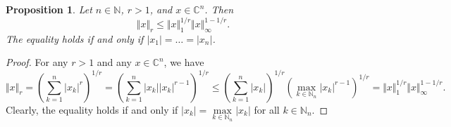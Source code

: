 \documentclass[12pt]{article}
\newtheorem{proposition}[theorem]{Proposition}
\begin{document}
\begin{proposition}\label{SpclLyapIneq}
    Let $n\in\mathbb{N}$, $r>1$, and $x\in\mathbb{C}^n$. Then
    \[
        \Vert x\Vert_r\leq \Vert x\Vert_1^{1/r}\Vert x\Vert_\infty^{1-1/r}.
    \]
    The equality holds if and only if $|x_1|=\ldots=|x_n|$.
\end{proposition}
\begin{proof}
    For any $r>1$ and any $x\in\mathbb{C}^n$, we have
    \[
        \Vert x\Vert_r
        =\left(\sum_{k=1}^n |x_k|^r \right)^{1/r}
        =\left(\sum_{k=1}^n |x_k| |x_k|^{r-1} \right)^{1/r}
        \leq\left(\sum_{k=1}^n |x_k| \right)^{1/r} 
        \left(\max\limits_{k\in\mathbb{N}_n}|x_k|^{r-1}\right)^{1/r}
        =\Vert x\Vert_1^{1/r}\Vert x\Vert_\infty^{1-1/r}.
    \]
    Clearly, the equality holds if and only if $|x_k|=\max\limits_{k\in\mathbb{N}_n}|x_k|$
    for all $k\in\mathbb{N}_n$.
\end{proof}
\end{document}

